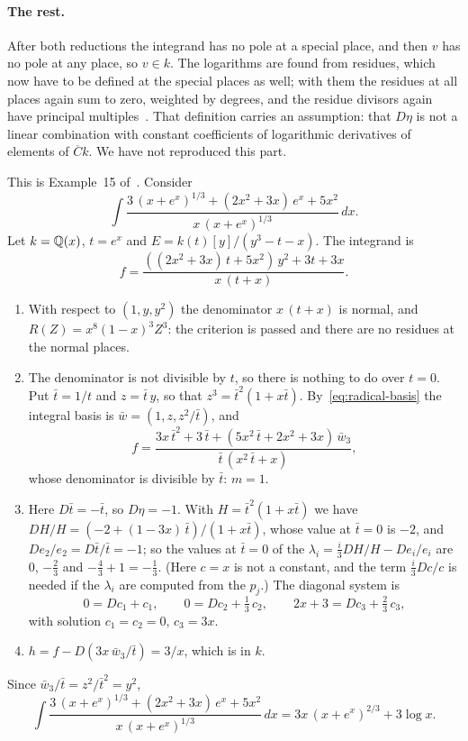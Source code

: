 \paragraph{The rest.} After both reductions the integrand has no pole at a
special place, and then $v$ has no pole at any place, so $v \in k$. The
logarithms are found from residues, which now have to be defined at the
special places as well; with them the residues at all places again sum to
zero, weighted by degrees, and the residue divisors again have principal
multiples~\cite[Definition~2.21, Propositions~2.22 to~2.24]{bronstein1990}.
That definition carries an assumption: that $D\eta$ is not a linear
combination with constant coefficients of logarithmic derivatives of elements
of $\overline{C} k$. We have not reproduced this part.

\begin{example}\label{ex:elem-exp}
This is Example~15 of~\cite{bronstein1998tutorial}. Consider
\[
  \int \frac{3\,(x + e^x)^{1/3} + (2x^2 + 3x)\,e^x + 5x^2}{x\,(x + e^x)^{1/3}}\, dx .
\]
Let $k = \mathbb{Q}(x)$, $t = e^x$ and $E = k(t)[y]/(y^3 - t - x)$. The integrand is
\[
  f = \frac{((2x^2 + 3x)\,t + 5x^2)\,y^2 + 3t + 3x}{x\,(t + x)} .
\]
\begin{enumerate}
\item With respect to $(1, y, y^2)$ the denominator $x\,(t + x)$ is normal,
  and $R(Z) = x^8 (1 - x)^3 Z^3$: the criterion is passed and there are no
  residues at the normal places.
\item The denominator is not divisible by $t$, so there is nothing to do
  over $t = 0$. Put $\bar t = 1/t$ and $z = \bar t\,y$, so that $z^3 = \bar
  t^2 (1 + x \bar t)$. By~\eqref{eq:radical-basis} the integral basis is
  $\bar w = (1, z, z^2/\bar t)$, and
  \[
    f = \frac{3x\,\bar t^2 + 3\,\bar t + (5x^2\,\bar t + 2x^2 + 3x)\,\bar w_3}
             {\bar t\,(x^2\,\bar t + x)} ,
  \]
  whose denominator is divisible by $\bar t$: $m = 1$.
\item Here $D\bar t = -\bar t$, so $D\eta = -1$. With $H = \bar t^2 (1 + x
  \bar t)$ we have $DH/H = (-2 + (1 - 3x)\,\bar t)/(1 + x \bar t)$, whose
  value at $\bar t = 0$ is $-2$, and $De_2/e_2 = D\bar t/\bar t = -1$; so the
  values at $\bar t = 0$ of the $\lambda_i = \frac{i}{3} DH/H - De_i/e_i$ are
  $0$, $-\frac23$ and $-\frac43 + 1 = -\frac13$. (Here $c = x$ is not a
  constant, and the term $\frac{i}{3} Dc/c$ is needed if the $\lambda_i$ are
  computed from the $p_j$.) The diagonal
  system is
  \[
    0 = Dc_1 + c_1, \qquad 0 = Dc_2 + \tfrac13\, c_2, \qquad
    2x + 3 = Dc_3 + \tfrac23\, c_3 ,
  \]
  with solution $c_1 = c_2 = 0$, $c_3 = 3x$.
\item $h = f - D(3x\,\bar w_3/\bar t) = 3/x$, which is in $k$.
\end{enumerate}
Since $\bar w_3 / \bar t = z^2/\bar t^2 = y^2$,
\[
  \int \frac{3\,(x + e^x)^{1/3} + (2x^2 + 3x)\,e^x + 5x^2}{x\,(x + e^x)^{1/3}}\, dx
  = 3x\,(x + e^x)^{2/3} + 3 \log x .
\]
\end{example}

